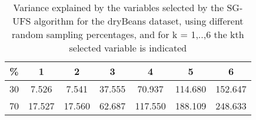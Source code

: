 \begin{table}
	\begin{center}
		\begin{tabular}{c c c c c c c}
			\% & 1 & 2 & 3 & 4 & 5 & 6 \\
			\hline
			30 & 7.526 & 7.541 & 37.555 & 70.937 & 114.680 & 152.647 \\
			70 & 17.527 & 17.560 & 62.687 & 117.550 & 188.109 & 248.633 \\
		\end{tabular}
	\end{center}
	\caption{Variance explained by the variables selected by the SG-UFS algorithm for the dryBeans dataset, using different random sampling percentages, and for k = 1,..,6 the kth selected variable is indicated}
\end{table}